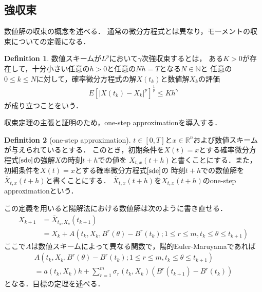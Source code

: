 \documentclass[dvipdfmx,autodetect-engine]{jsarticle}
\theoremstyle{remark}
\theoremstyle{definition}
\newtheorem{definition}{Definition}[section]
\newcommand{\R}{\mathbb{R}}
\newcommand{\N}{\mathbb{N}}
\newcommand{\abs}[1]{\left\lvert#1\right\rvert}
\begin{document}
\subsection{強収束}
数値解の収束の概念を述べる．
通常の微分方程式とは異なり，モーメントの収束についての定義になる．


\begin{definition}
    数値スキームが$L^p$において$\gamma$次強収束するとは，
    ある$K>0$が存在して，十分小さい任意の$h>0$と任意の$Nh=T$となる$N \in \N$と
    任意の$0\leq k\leq N$に対して，確率微分方程式の解$X(t_{k})$と数値解$X_{k}$の評価
    \begin{align}
        E[\abs{X(t_{k}) - X_{k}}^{p}]^{\frac{1}{p}} \leq Kh^{\gamma}
    \end{align}
    が成り立つことをいう．
\end{definition}


収束定理の主張と証明のため，one-step approximationを導入する．
\begin{definition}[one-step approximation]
    $t\in [0,T]$と$x \in \R^{n}$および数値スキームが与えられているとする．
    このとき，初期条件を$X(t)=x$とする確率微分方程式$\eqref{sde}$の強解$X$の時刻$t+h$での値を
    $X_{t,x}(t+h)$と書くことにする．また，初期条件を$X(t)=x$とする確率微分方程式$\eqref{sde}$の
    時刻$t+h$での数値解を$\bar{X}_{t,x}(t+h)$と書くことにする．
    $\bar{X}_{t,x}(t+h)$を$X_{t,x}(t+h)$のone-step approximationという．
\end{definition}


この定義を用いると陽解法における数値解は次のように書き直せる．
\begin{align}
    X_{k+1} &= \bar{X}_{t_{k},X_{k}}(t_{k+1}) \\
            &= X_{k} + A\left(t_{k},X_{k},B^{r}(\theta)-B^{r}(t_{k})
            ; 1\leq r\leq m ,t_{k} \leq \theta \leq t_{k+1} \right)
\end{align}
ここで$A$は数値スキームによって異なる関数で，陽的Euler-Maruyamaであれば
\begin{align}
    A\left(t_{k},X_{k},B^{r}(\theta)-B^{r}(t_{k})
    ; 1\leq r\leq m ,t_{k} \leq \theta \leq t_{k+1} \right) \\
    = a(t_{k},X_{k})h + \sum_{r=1}^{m}\sigma_{r}(t_{k},X_{k})(B^{r}(t_{k+1})-B^{r}(t_{k}))
\end{align}
となる．目標の定理を述べる．
\end{document}
